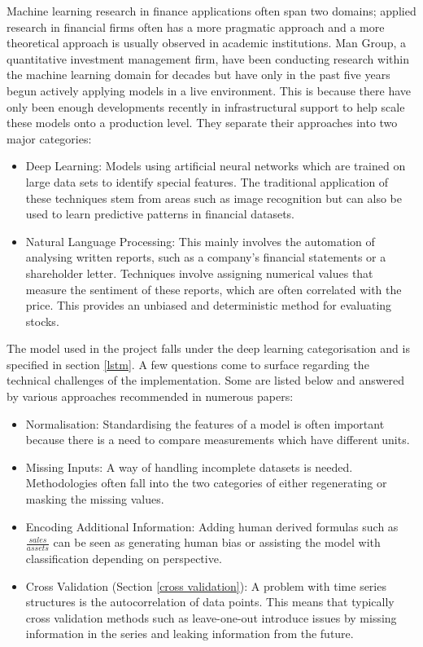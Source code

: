\documentclass[10pt,onecolumn,letterpaper]{article}
\begin{document}
Machine learning research in finance applications often span two domains; applied research in financial firms often has a more pragmatic approach and a more theoretical approach is usually observed in academic institutions. Man Group, a quantitative investment management firm, have been conducting research\cite{Man_Group} within the machine learning domain for decades but have only in the past five years begun actively applying models in a live environment. This is because there have only been enough developments recently in infrastructural support to help scale these models onto a production level. They separate their approaches into two major categories:
\begin{itemize}
	\item Deep Learning: Models using artificial neural networks which are trained on large data sets to identify special features. The traditional application of these techniques stem from areas such as image recognition but can also be used to learn predictive patterns in financial datasets. 
	\item Natural Language Processing: This mainly involves the automation of analysing written reports, such as a company's financial statements or a shareholder letter. Techniques involve assigning numerical values that measure the sentiment of these reports, which are often correlated with the price. This provides an unbiased and deterministic method for evaluating stocks. 
\end{itemize}
The model used in the project falls under the deep learning categorisation and is specified in section \ref{lstm}. A few questions come to surface regarding the technical challenges of the implementation. Some are listed below and answered by various approaches recommended in numerous papers: 
\begin{itemize}
	\item Normalisation: Standardising the features of a model is often important because there is a need to compare measurements which have different units. 
	\item Missing Inputs: A way of handling incomplete datasets is needed. Methodologies often fall into the two categories of either regenerating or masking the missing values. 
	\item Encoding Additional Information: Adding human derived formulas such as $\frac{sales}{assets}$ can be seen as generating human bias or assisting the model with classification depending on perspective. 
	\item Cross Validation (Section \ref{cross validation}): A problem with time series structures is the autocorrelation of data points. This means that typically cross validation methods such as leave-one-out introduce issues by missing information in the series and leaking information from the future. 
\end{itemize}
\end{document}
